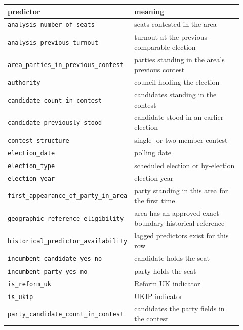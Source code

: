 \begin{tabular}{p{0.42\linewidth}p{0.50\linewidth}}
\toprule
predictor & meaning \\
\midrule
\texttt{analysis\_\allowbreak{}number\_\allowbreak{}of\_\allowbreak{}seats} & seats contested in the area \\
\texttt{analysis\_\allowbreak{}previous\_\allowbreak{}turnout} & turnout at the previous comparable election \\
\texttt{area\_\allowbreak{}parties\_\allowbreak{}in\_\allowbreak{}previous\_\allowbreak{}contest} & parties standing in the area's previous contest \\
\texttt{authority} & council holding the election \\
\texttt{candidate\_\allowbreak{}count\_\allowbreak{}in\_\allowbreak{}contest} & candidates standing in the contest \\
\texttt{candidate\_\allowbreak{}previously\_\allowbreak{}stood} & candidate stood in an earlier election \\
\texttt{contest\_\allowbreak{}structure} & single- or two-member contest \\
\texttt{election\_\allowbreak{}date} & polling date \\
\texttt{election\_\allowbreak{}type} & scheduled election or by-election \\
\texttt{election\_\allowbreak{}year} & election year \\
\texttt{first\_\allowbreak{}appearance\_\allowbreak{}of\_\allowbreak{}party\_\allowbreak{}in\_\allowbreak{}area} & party standing in this area for the first time \\
\texttt{geographic\_\allowbreak{}reference\_\allowbreak{}eligibility} & area has an approved exact-boundary historical reference \\
\texttt{historical\_\allowbreak{}predictor\_\allowbreak{}availability} & lagged predictors exist for this row \\
\texttt{incumbent\_\allowbreak{}candidate\_\allowbreak{}yes\_\allowbreak{}no} & candidate holds the seat \\
\texttt{incumbent\_\allowbreak{}party\_\allowbreak{}yes\_\allowbreak{}no} & party holds the seat \\
\texttt{is\_\allowbreak{}reform\_\allowbreak{}uk} & Reform UK indicator \\
\texttt{is\_\allowbreak{}ukip} & UKIP indicator \\
\texttt{party\_\allowbreak{}candidate\_\allowbreak{}count\_\allowbreak{}in\_\allowbreak{}contest} & candidates the party fields in the contest \\

\end{tabular}
